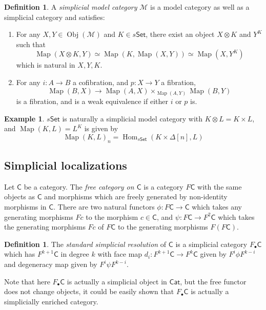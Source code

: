 \documentclass[12pt]{amsart}
\theoremstyle{definition}
\newtheorem{example}[thm]{Example}
\newtheorem{defn}[thm]{Definition}
\theoremstyle{remark}
\numberwithin{equation}{section}
\newcommand{\CM}{{\mathcal M}}
\newcommand{\CC}{{\mathsf C}}
\newcommand{\1}{{\mathbb{1}}}
\newcommand{\ob}{\operatorname{Obj}}
\newcommand{\set}{\mathsf{Set}}
\newcommand{\cat}{\mathsf{Cat}}
\newcommand{\Hom}{\operatorname{Hom}}
\newcommand{\map}{\operatorname{Map}}
\begin{document}
\begin{defn}
	A {\it simplicial model category} $\CM$ is a model category as well as a simplicial category and satisfies:
	\begin{enumerate}
		\item For any $X, Y \in \ob(\CM)$ and $K\in s\set$, there exist an object $X\otimes K$ and $Y^K$ such that
		\begin{equation*}
		\map(X\otimes K, Y)\simeq \map (K, \map (X,Y))\simeq \map (X, Y^K)
		\end{equation*} 
		which is natural in $X, Y, K$.
		\item  For any $i: A\to B$ a cofibration, and $p:X\to Y$ a fibration,
		\begin{equation*}
		 \map(B,X) \to \map (A,X) \times_{\map(A,Y)} \map(B, Y)
		\end{equation*}
		is a fibration, and is a weak equivalence if either $i$ or $p$ is.
	\end{enumerate}
\end{defn}

\begin{example}
	$s\set$ is naturally a simplicial model category with $K\otimes L = K \times L$, and $\map(K,L)=L^K$ is given by
	\begin{equation*}
	\map(K,L)_n = \Hom_{s\set}(K\times \Delta[n], L)
	\end{equation*}
\end{example}
\subsection{Simplicial localizations}
Let $\CC$ be a category. The {\it free category on $\CC$} is a category $F\CC$ with the same objects as $\CC$ and morphisms which are freely generated by non-identity morphisms in $\CC$. There are two natural functors $\phi: F\CC \to \CC$ which takes any generating morphisms $Fc$ to the morphism $c\in \CC$, and $\psi: F\CC \to F^2\CC$ which takes the generating morphisms $Fc$ of $F\CC$ to the generating morphisms $F(F\CC)$.


\begin{defn}
	The {\it standard simplicial resolution} of $\CC$ is a simplicial category $F_{\bullet}\CC$ which has $F^{k+1}\CC$ in degree $k$ with face map $d_i: F^{k+1} \CC \to F^k \CC$ given by $F^i\phi F^{k-i}$ and degeneracy map given by $F^i\psi F^{k-i}$. 
\end{defn}
Note that here $F_{\bullet}\CC$ is actually a simplicial object in $\cat$, but the free functor does not change objects, it could be easily shown that $F_{\bullet}\CC$ is actually a simplicially enriched category.
\end{document}
